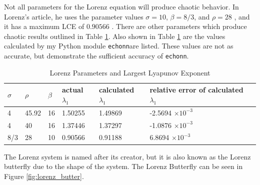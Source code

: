 \documentclass{article}
\newcommand{\echonn}{\texttt{echonn}}
\begin{document}
Not all parameters for the Lorenz equation will produce chaotic behavior. In
Lorenz's article, he uses the parameter values $\sigma=10$, $\beta=8/3$, and
$\rho=28$ \cite{lorenz1963deterministic}, and it has a maximum LCE of
$0.90566$ \cite{viswanath1998lyapunov}. There are other parameters which
produce chaotic results outlined in Table \ref{table:lorenz_params}. Also
shown in Table \ref{table:lorenz_params} are the values calculated by my
Python module \echonn are listed. These values are not as accurate,
but demonstrate the sufficient accuracy of \echonn.

\begin{table}[H]
    \centering
    \begin{tabular}{|l|l|l|l|l|l|l|}
        \hline
        $\sigma$ & $\rho$ & $\beta$ & actual $\lambda_1$ & calculated $\lambda_1$ & relative error of calculated $\lambda_1$ \\
        \hline \hline
        4 & 45.92 & 16 & 1.50255 & 1.49869 & -2.5694 $\times 10^{-3}$ \\ %
        4 & 40 & 16 & 1.37446 & 1.37297 & -1.0876 $\times 10^{-3}$ \\
        8/3 & 28 & 10 & 0.90566 & 0.91188 & 6.8694 $\times 10^{-3}$ \\
        \hline
    \end{tabular}
    \caption{
        Lorenz Parameters and Largest Lyapunov Exponent
        \cite{viswanath1998lyapunov}
    }
    \label{table:lorenz_params}
\end{table}

The Lorenz system is named after its creator, but it is also known as the
Lorenz butterfly due to the shape of the system. The Lorenz
Butterfly can be seen in Figure \ref{fig:lorenz_butter}.
\end{document}
